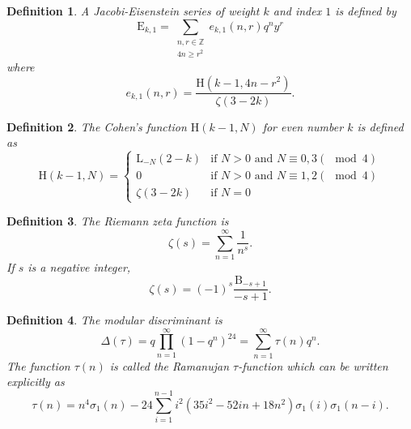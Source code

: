 \documentclass[uplatex,dvipdfmx]{jsarticle}
\newtheorem{definition}{Definition}[section]
\begin{document}
\begin{definition}
    A Jacobi-Eisenstein series of weight
    $k$
    and index
    $1$
    is defined by
    \begin{equation}
        \mathrm{E}_{k, 1}
        =
        \sum_{\substack{n, r \in \mathbb{Z} \\ 4n \geq r^2}}
        e_{k, 1}(n, r)
        q^n y^r
    \end{equation}
    where
    \begin{equation}
        e_{k, 1}(n, r)
        =
        \frac{\mathrm{H}\left( k - 1, 4n - r^2 \right)}
        {\zeta(3 - 2k)}.
    \end{equation}
\end{definition}

\begin{definition}
    The Cohen's function
    $\mathrm{H}(k - 1, N)$
    for even number
    $k$
    is defined as
    \begin{equation}
        \mathrm{H}(k - 1, N)
        =
        \begin{cases}
            \mathrm{L}_{-N}(2 - k)
            &\text{if $N > 0$ and $N \equiv 0, 3 (\mod 4)$}\\
            0
            &\text{if $N > 0$ and $N \equiv 1, 2 (\mod 4)$}\\
            \zeta(3 - 2k)
            &\text{if $N = 0$}
        \end{cases}
    \end{equation}
\end{definition}

\begin{definition}
    The Riemann zeta function is
    \begin{equation}
        \zeta (s)
        =
        \sum_{n = 1}^\infty
        \frac{1}{n^s}.
    \end{equation}
    If
    $s$
    is a negative integer,
    \begin{equation}
        \zeta(s)
        =
        (-1)^s \frac{\mathrm{B}_{-s + 1}}{-s + 1}.
    \end{equation}
\end{definition}

\begin{definition}
    The modular discriminant is
    \begin{equation}
        \Delta(\tau)
        =
        q \prod_{n = 1}^\infty (1 - q^n)^{24}
        =
        \sum_{n = 1}^\infty
        \tau (n) q^n.
    \end{equation}
    The function 
    $\tau(n)$ is called the Ramanujan $\tau$-function
    which can be written explicitly as
    \begin{equation}
        \tau(n)
        =
        n^4 \sigma_1 (n)
        - 24
        \sum_{i = 1}^{n - 1}
        i^2 (35i^2 - 52in + 18n^2)
        \sigma_1 (i)
        \sigma_1 (n - i).
    \end{equation}
\end{definition}
\end{document}
